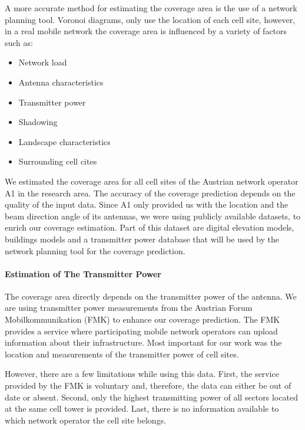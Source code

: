 \documentclass[twocolumn]{bmcart}%
\begin{document}
A more accurate method for estimating the coverage area is the use of a network planning tool. Voronoi diagrams, only use the location of each cell site, however, in a real mobile network the coverage area is influenced by a variety of factors such as:
\begin{itemize}
\item Network load
\item Antenna characteristics
\item Transmitter power
\item Shadowing
\item Landscape characteristics
\item Surrounding cell cites
\end{itemize}

We estimated the coverage area for all cell sites of the Austrian network operator A1 in the research area. The accuracy of the coverage prediction depends on the quality of the input data. Since A1 only provided us with the location and the beam direction angle of its antennas, we were using publicly available datasets, to enrich our coverage estimation. Part of this dataset are digital elevation models, buildings models and a transmitter power database that will be used by the network planning tool for the coverage prediction.

\paragraph{Estimation of The Transmitter Power}
The coverage area directly depends on the transmitter power of the antenna. We are using transmitter power measurements from the Austrian Forum Mobilkommunikation (FMK) to enhance our coverage prediction. The FMK  provides a service where participating mobile network operators can upload information about their infrastructure. Most important for our work was the location and measurements of the transmitter power of cell sites.

However, there are a few limitations while using this data. First, the service provided by the FMK is voluntary and, therefore, the data can either be out of date or absent. Second, only the highest transmitting power of all sectors located at the same cell tower is provided. Last, there is no information available to which network operator the cell site belongs.
\end{document}
